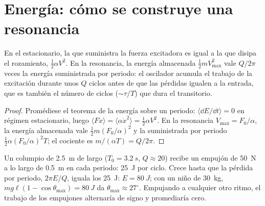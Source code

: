 \section{Energía: cómo se construye una resonancia}

\begin{proposition}\label{prop:b1:oscillators-resonance:energy}
En el  estacionario, la  que suministra la
fuerza excitadora es igual a la  que disipa el rozamiento,
$\tfrac12\alpha V^2$. En la resonancia, la energía almacenada
$\tfrac12 mV_{\max}^2$ vale $Q/2\pi$ veces la energía suministrada por
periodo: el oscilador acumula el trabajo de la excitación durante unos $Q$
ciclos antes de que las pérdidas igualen a la entrada, que es también el
número de ciclos ($\sim\tau/T$) que dura el transitorio.
\end{proposition}

\begin{proof}
Promédiese el teorema de la energía sobre un periodo: $\langle\dd E/\dd t\rangle = 0$
en régimen estacionario, luego $\langle F\dot x\rangle = \langle\alpha\dot x^2\rangle =
\tfrac12\alpha V^2$. En la resonancia $V_{\max} = F_0/\alpha$, la energía
almacenada vale $\tfrac12 m(F_0/\alpha)^2$ y la suministrada por periodo
$\tfrac12\alpha(F_0/\alpha)^2T$; el cociente es $m/(\alpha T) = Q/2\pi$.
\end{proof}

\begin{example}[El columpio]\label{ex:b1:oscillators-resonance:swing}
Un columpio de \qty{2.5}{m} de largo ($T_0 = \qty{3.2}{s}$, $Q \approx 20$)
recibe un empujón de \qty{50}{N} a lo largo de \qty{0.5}{m} en cada
periodo: \qty{25}{J} por ciclo. Crece hasta que la pérdida por periodo,
$2\pi E/Q$, iguala los \qty{25}{J}: $E = \qty{80}{J}$; con un niño de
\qty{30}{kg}, $mg\ell(1 -
\cos\theta_{\max}) = \qty{80}{J}$ da $\theta_{\max} \approx 27^\circ$.
Empujando a cualquier otro ritmo, el trabajo de los empujones alternaría
de signo y promediaría cero.
\end{example}

